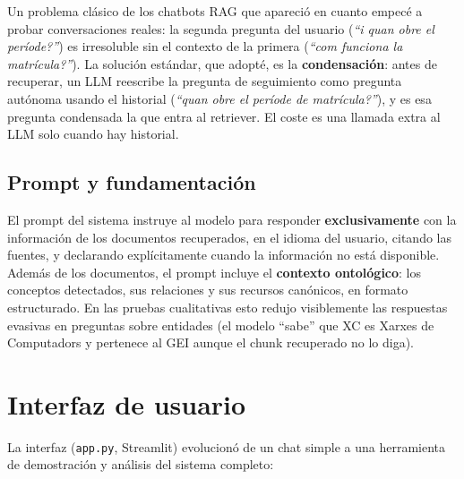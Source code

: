 \documentclass[12pt, a4paper, twoside]{report}
\begin{document}
Un problema cl\'asico de los chatbots RAG que apareci\'o en cuanto empec\'e a probar conversaciones reales: la segunda pregunta del usuario (\textit{``i quan obre el per\'iode?''}) es irresoluble sin el contexto de la primera (\textit{``com funciona la matr\'icula?''}). La soluci\'on est\'andar, que adopt\'e, es la \textbf{condensaci\'on}: antes de recuperar, un LLM reescribe la pregunta de seguimiento como pregunta aut\'onoma usando el historial (\textit{``quan obre el per\'iode de matr\'icula?''}), y es esa pregunta condensada la que entra al retriever. El coste es una llamada extra al LLM solo cuando hay historial.

\subsection{Prompt y fundamentaci\'on}

El prompt del sistema instruye al modelo para responder \textbf{exclusivamente} con la informaci\'on de los documentos recuperados, en el idioma del usuario, citando las fuentes, y declarando expl\'icitamente cuando la informaci\'on no est\'a disponible. Adem\'as de los documentos, el prompt incluye el \textbf{contexto ontol\'ogico}: los conceptos detectados, sus relaciones y sus recursos can\'onicos, en formato estructurado. En las pruebas cualitativas esto redujo visiblemente las respuestas evasivas en preguntas sobre entidades (el modelo ``sabe'' que XC es Xarxes de Computadors y pertenece al GEI aunque el chunk recuperado no lo diga).

\section{Interfaz de usuario}

La interfaz (\texttt{app.py}, Streamlit) evolucion\'o de un chat simple a una herramienta de demostraci\'on y an\'alisis del sistema completo:
\end{document}
